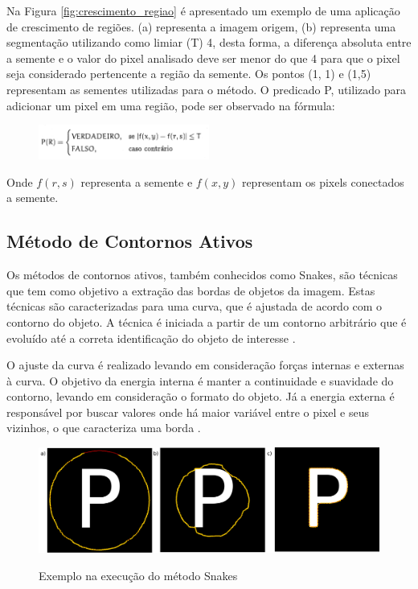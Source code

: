 \documentclass[
	12pt,				%
	oneside,			%
	a4paper,			%
	english,			%
	french,				%
	spanish,			%
	brazil,				%
	]{abntex2}
\begin{document}
Na Figura \ref{fig:crescimento_regiao} é apresentado um exemplo de uma aplicação de crescimento de regiões. (a) representa a imagem origem, (b) representa uma segmentação utilizando como limiar (T) 4, desta forma, a diferença absoluta entre a semente e o valor do pixel analisado deve ser menor do que 4 para que o pixel seja considerado pertencente a região da semente. Os pontos (1, 1) e (1,5) representam as sementes utilizadas para o método. O predicado P, utilizado para adicionar um pixel em uma região, pode ser observado na fórmula:

\begin{figure}[ht]
\centering
\includegraphics[width=0.5\textwidth]{imagens/crescimentoregiao_formula.png}
\end{figure}

Onde \(f(r,s)\) representa a semente e \(f(x, y)\) representam os pixels conectados a semente.
    
\subsection{Método de Contornos Ativos}     

Os métodos de contornos ativos, também conhecidos como Snakes, são técnicas que tem como objetivo a extração das bordas de objetos da imagem. Estas técnicas são caracterizadas para uma curva, que é ajustada de acordo com o contorno do objeto. A técnica é iniciada a partir de um contorno arbitrário que é evoluído até a correta identificação do objeto de interesse \cite{conciAzevedoLeta:2008}.

O ajuste da curva é realizado levando em consideração forças internas e externas à curva. O objetivo da energia interna é manter a continuidade e suavidade do contorno, levando em consideração o formato do objeto. Já a energia externa é responsável por buscar valores onde há maior variável entre o pixel e seus vizinhos, o que caracteriza uma borda \cite{kass:1988}.

\begin{figure}[ht]
\centering
\caption{Exemplo na execução do método Snakes}
\includegraphics[width=1\textwidth]{imagens/snake.png}
\sourceAuthor
\label{fig:snake}
\end{figure}
\end{document}
